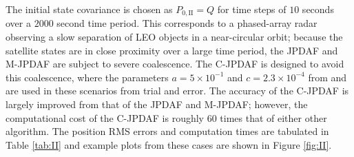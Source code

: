 The initial state covariance is chosen as $P_{0,\text{II}}=Q$ for time steps of $10$ seconds over a $2000$ second time period.
This corresponds to a phased-array radar observing a slow separation of LEO objects in a near-circular orbit; because the satellite states are in close proximity over a large time period, the JPDAF and M-JPDAF are subject to severe coalescence.
The C-JPDAF is designed to avoid this coalescence, where the parameters $a=5\times10^{-1}$ and $c=2.3\times10^{-4}$ from  and  are used in these scenarios from trial and error.
The accuracy of the C-JPDAF is largely improved from that of the JPDAF and M-JPDAF; however, the computational cost of the C-JPDAF is roughly $60$ times that of either other algorithm.
The position RMS errors and computation times are tabulated in Table \ref{tab:II} and example plots from these cases are shown in Figure \ref{fig:II}.

